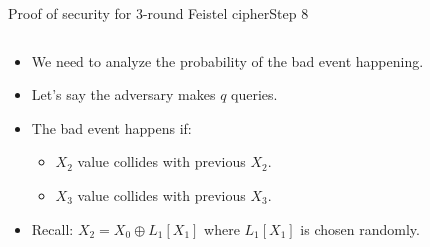 \documentclass[aspectratio=169, lualatex, handout]{beamer}
\begin{document}
\begin{frame}{Proof of security for 3-round Feistel cipher}{Step 8}
	\begin{columns}[c]
		\begin{column}{0.5\textwidth}
			\begin{itemize}[<+->]
				\item We need to analyze the probability of the bad event happening.
				\item Let's say the adversary makes $q$ queries.
				\item The bad event happens if:
				      \begin{itemize}[<+->]
					      \item $X_2$ value collides with previous $X_2$.
					      \item $X_3$ value collides with previous $X_3$.
				      \end{itemize}
				\item Recall: $X_2 = X_0 \oplus L_1[X_1]$ where $L_1[X_1]$ is chosen randomly.
			\end{itemize}
		\end{column}
		\begin{column}{0.5\textwidth}
			\vspace{-1.5cm}
			\begin{center}
			\end{center}
		\end{column}
	\end{columns}
\end{frame}
\end{document}
